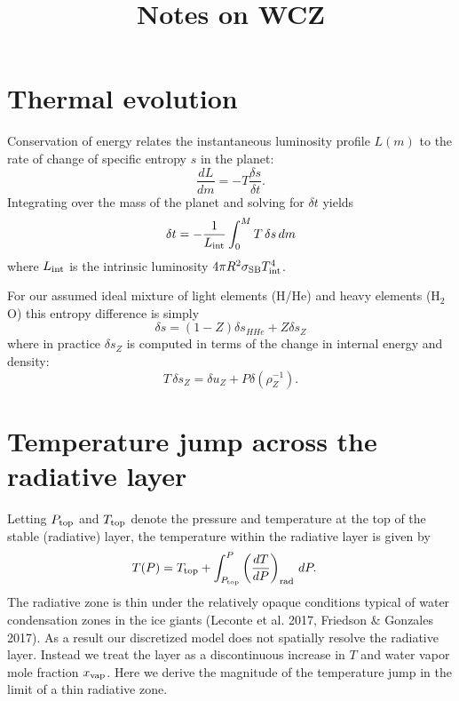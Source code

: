 \documentclass[12pt]{article}
\begin{document}

\pagecolor{white}
\color{black}

\title{Notes on WCZ}
\maketitle

\section{Thermal evolution}
Conservation of energy relates the instantaneous luminosity profile $L(m)$ to the rate of change of specific entropy $s$ in the planet:
\begin{equation}
  \frac{dL}{dm}=-T\frac{\delta s}{\delta t}.
\end{equation}
Integrating over the mass of the planet and solving for $\delta t$ yields
\begin{equation}
\delta t=-\frac{1}{L_{\rm int}}\int_0^M T\,\delta s\,dm
\end{equation}
where $L_{\rm int}$ is the intrinsic luminosity $4\pi R^2\sigma_{\rm SB}T_{\rm int}^4$.

For our assumed ideal mixture of light elements (H/He) and heavy elements (H$_2$O) this entropy difference is simply
\begin{equation}
  \delta s = (1-Z)\delta s_{HHe} + Z\delta s_Z
\end{equation}
where in practice $\delta s_Z$ is computed in terms of the change in internal energy and density:
\begin{equation}
  T\,\delta s_Z = \delta u_Z + P\delta\left(\rho_Z^{-1}\right).
\end{equation}

\section{Temperature jump across the radiative layer}
Letting $P_{\rm top}$ and $T_{\rm top}$ denote the pressure and temperature at the top of the stable (radiative) layer, the temperature within the radiative layer is given by
\begin{align}
T(P) &= T_{\rm top} + \int_{P_{\rm top}}^P\left(\frac{dT}{dP}\right)_{\rm rad}\,d P. \label{eq.t_of_p}
\end{align}
The radiative zone is thin under the relatively opaque conditions typical of water condensation zones in the ice giants (Leconte et al. 2017, Friedson \& Gonzales 2017). As a result our discretized model does not spatially resolve the radiative layer. Instead we treat the layer as a discontinuous increase in $T$ and water vapor mole fraction $x_{\rm vap}$. Here we derive the magnitude of the temperature jump in the limit of a thin radiative zone.
\end{document}
